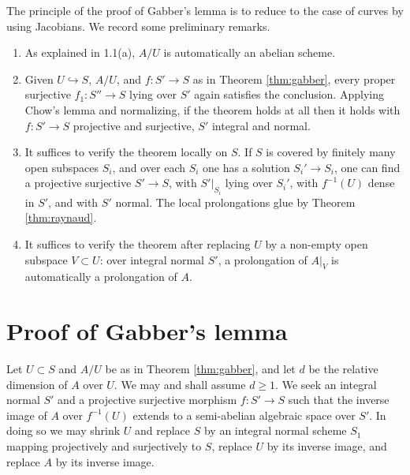 The principle of the proof of Gabber's lemma is to reduce to the case of curves by using Jacobians. We record some preliminary remarks.
\begin{enumerate}[label=(\alph*)]
\item As explained in 1.1(a), $A/U$ is automatically an abelian scheme.
\item Given $U\hookrightarrow S$, $A/U$, and $f:S'\to S$ as in Theorem \ref{thm:gabber}, every proper surjective $f_1:S''\to S$ lying over $S'$ again satisfies the conclusion. Applying Chow's lemma and normalizing, if the theorem holds at all then it holds with $f:S'\to S$ projective and surjective, $S'$ integral and normal.
\item It suffices to verify the theorem locally on $S$. If $S$ is covered by finitely many open subspaces $S_i$, and over each $S_i$ one has a solution $S_i'\to S_i$, one can find a projective surjective $S'\to S$, with $S'|_{S_i}$ lying over $S_i'$, with $f^{-1}(U)$ dense in $S'$, and with $S'$ normal. The local prolongations glue by Theorem \ref{thm:raynaud}.
\item It suffices to verify the theorem after replacing $U$ by a non-empty open subspace $V\subset U$: over integral normal $S'$, a prolongation of $A|_V$ is automatically a prolongation of $A$.
\end{enumerate}

\section{Proof of Gabber's lemma}

Let $U\subset S$ and $A/U$ be as in Theorem \ref{thm:gabber}, and let $d$ be the relative dimension of $A$ over $U$. We may and shall assume $d\ge1$. We seek an integral normal $S'$ and a projective surjective morphism $f:S'\to S$ such that the inverse image of $A$ over $f^{-1}(U)$ extends to a semi-abelian algebraic space over $S'$. In doing so we may shrink $U$ and replace $S$ by an integral normal scheme $S_1$ mapping projectively and surjectively to $S$, replace $U$ by its inverse image, and replace $A$ by its inverse image.

